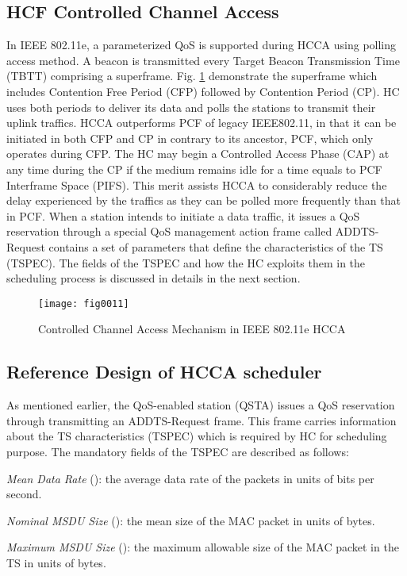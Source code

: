 \documentclass[a4paper, conference]{IEEEtran}
\begin{document}
\subsection{HCF Controlled Channel Access}
In IEEE 802.11e, a parameterized QoS is supported during HCCA using polling access method. A beacon is transmitted every Target Beacon Transmission Time (TBTT) comprising a superframe. Fig. \ref{fig001} demonstrate the superframe which includes Contention Free Period (CFP) followed by Contention Period (CP). HC uses both periods to deliver its data and polls the stations to transmit their uplink traffics. HCCA outperforms PCF of legacy IEEE802.11, in that it can be initiated in both CFP and CP in contrary to its ancestor, PCF, which only operates during  CFP. The HC may begin a Controlled Access Phase (CAP) at any time during the CP if the medium remains idle for a time equals to PCF Interframe Space (PIFS). This merit assists HCCA to considerably reduce the delay experienced by the traffics as they can be polled more frequently than that in PCF. When a station intends to initiate a data traffic, it issues a QoS reservation through a special QoS management action frame called ADDTS-Request contains a set of parameters that define the characteristics of the TS (TSPEC). The fields of the TSPEC and how the HC exploits them in the scheduling process is discussed in details in the next section.
\begin{figure}[hbtp]
\centering
\texttt{[image: fig0011]}
\caption{Controlled Channel Access Mechanism in IEEE 802.11e HCCA}
\label{fig001}
\end{figure}
\subsection{Reference Design of HCCA scheduler}
\label{sec:HCCA}
As mentioned earlier, the QoS-enabled station (QSTA) issues a QoS reservation through transmitting an ADDTS-Request frame. This frame carries information about the TS characteristics (TSPEC) which is required by HC for scheduling purpose. The mandatory fields of the TSPEC are described as follows:

\textit{Mean Data Rate} (): the average data rate of the packets in units of bits per second.

\textit{Nominal MSDU Size} (): the mean size of the MAC packet in units of bytes.

\textit{Maximum MSDU Size} (): the maximum allowable size of the MAC packet in the TS in units of bytes.
\end{document}
